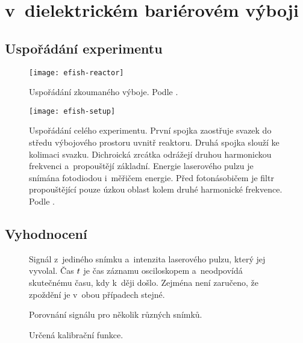 \chapter[\EFISH]{{\EFISH} v~dielektrickém bariérovém výboji}

\newcommand\ypos{y}

\section{Uspořádání experimentu}
\label{sec:efish-setup}

\begin{figure}
	\texttt{[image: efish-reactor]}
	\caption{Uspořádání zkoumaného výboje. Podle \cite{efish-nitrogen}.}
\end{figure}

\begin{figure}
	\texttt{[image: efish-setup]}
	\caption{Uspořádání celého experimentu.
	První spojka zaostřuje svazek do středu výbojového prostoru
	uvnitř reaktoru.
	Druhá spojka slouží ke kolimaci svazku.
	Dichroická zrcátka odrážejí druhou harmonickou frekvenci
	a~propouštějí základní.
	Energie laserového pulzu je snímána fotodiodou i~měřičem energie.
	Před fotonásobičem je filtr propouštějící pouze úzkou oblast
	kolem druhé harmonické frekvence.
	Podle \cite{efish-nitrogen}.}
\end{figure}

\section{Vyhodnocení}
\label{sec:efish-method}

\begin{figure}[htp]
	\centering
	
	\caption{Signál \EFISH{} z~jediného snímku
		a~intenzita laserového pulzu, který jej vyvolal.
		Čas $t$ je čas záznamu osciloskopem a~neodpovídá skutečnému času,
		kdy k~ději došlo.
		Zejména není zaručeno, že zpoždění je v~obou případech stejné.}
	\label{fig:efish-singleshot}
\end{figure}

\begin{figure}[htp]
	\centering
	
	\caption{Porovnání signálu \EFISH{} pro několik různých snímků.}
	\label{fig:efish-singleshots-compare}
\end{figure}

\begin{figure}
	
	\caption{Určená kalibrační funkce.}
\end{figure}

